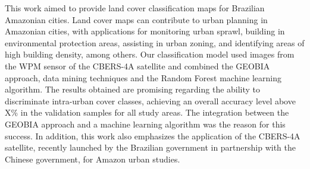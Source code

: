 \documentclass[preprint, 3p,
authoryear]{elsarticle} %
\begin{document}
This work aimed to provide land cover classification maps for Brazilian
Amazonian cities. Land cover maps can contribute to urban planning in
Amazonian cities, with applications for monitoring urban sprawl,
building in environmental protection areas, assisting in urban zoning,
and identifying areas of high building density, among others. Our
classification model used images from the WPM sensor of the CBERS-4A
satellite and combined the GEOBIA approach, data mining techniques and
the Random Forest machine learning algorithm. The results obtained are
promising regarding the ability to discriminate intra-urban cover
classes, achieving an overall accuracy level above X\% in the validation
samples for all study areas. The integration between the GEOBIA approach
and a machine learning algorithm was the reason for this success. In
addition, this work also emphasizes the application of the CBERS-4A
satellite, recently launched by the Brazilian government in partnership
with the Chinese government, for Amazon urban studies.

\renewcommand\refname{References}

\end{document}
